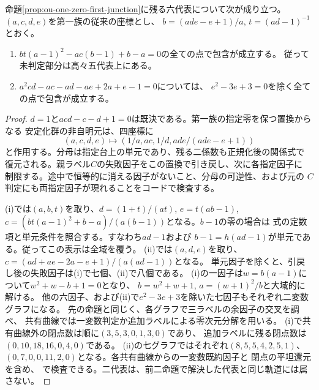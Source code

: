 \begin{proposition}[一零第一族の二つの安定化群座標]
\label{prop:ou-one-zero-first-two-slices}
命題\ref{prop:ou-one-zero-first-junction}に残る六代表について次が成り立つ。
$(a,c,d,e)$を第一族の従来の座標とし、
$b=(ade-e+1)/a$, $t=(ad-1)^{-1}$とおく。
\begin{enumerate}[label=(\roman*)]
\item $bt(a-1)^2-ac(b-1)+b-a=0$の全ての点で包含が成立する。
従って未判定部分は高々五代表上にある。
\item $a^2cd-ac-ad-ae+2a+e-1=0$については、
$e^2-3e+3=0$を除く全ての点で包含が成立する。
\end{enumerate}
\end{proposition}
\begin{proof}
$d=1$と$acd-c-d+1=0$は既決である。第一族の指定零を保つ置換からなる
安定化群の非自明元は、四座標に
\[
       (a,c,d,e)\longmapsto
       (1/a,ac,1/d,ade/(ade-e+1))
\]
と作用する。分母は指定台上の単元であり、残る二係数も正規化後の関係式で
復元される。親ラベル$C$の失敗因子をこの置換で引き戻し、次に各指定因子に
制限する。途中で恒等的に消える因子がないこと、分母の可逆性、および元の
$C$判定にも両指定因子が現れることをコードで検査する。

(i)では$(a,b,t)$を取り、$d=(1+t)/(at)$, $e=t(ab-1)$,
$c=(bt(a-1)^2+b-a)/(a(b-1))$となる。$b-1$の零の場合は
式の定数項と単元条件を照合する。すなわち$ad-1$および
$b-1=h(ad-1)$が単元である。従ってこの表示は全域を覆う。
(ii)では$(a,d,e)$を取り、$c=(ad+ae-2a-e+1)/(a(ad-1))$となる。
単元因子を除くと、引戻し後の失敗因子は(i)で七個、(ii)で八個である。
(i)の一因子は$w=b(a-1)$について$w^2+w-b+1=0$となり、
$b=w^2+w+1$, $a=(w+1)^2/b$と大域的に解ける。
他の六因子、および(ii)で$e^2-3e+3$を除いた七因子もそれぞれ二変数グラフになる。
先の命題と同じく、各グラフで三ラベルの余因子の交叉を調べ、
共有曲線では一変数判定か追加ラベルによる零次元分解を用いる。
(i)で共有曲線外の閉点数は順に$(3,5,3,0,1,3,0)$であり、
追加ラベルに残る閉点数は$(0,10,18,16,0,4,0)$である。
(ii)の七グラフではそれぞれ$(8,5,5,4,2,5,1)$、
$(0,7,0,0,11,2,0)$となる。各共有曲線からの一変数既約因子と
閉点の平坦還元を含め、
で検査できる。二代表は、前二命題で解決した代表と同じ軌道には属さない。
\end{proof}

